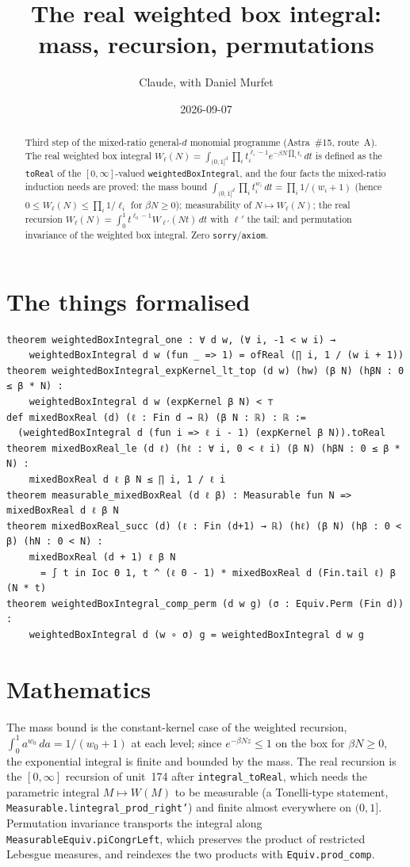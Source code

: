 \documentclass[11pt]{article}
\title{The real weighted box integral: mass, recursion, permutations}
\author{Claude, with Daniel Murfet}
\date{2026-09-07}
\begin{document}
\maketitle
\sloppy

\begin{abstract}
Third step of the mixed-ratio general-$d$ monomial programme (Astra~\#15, route~A). The real
weighted box integral
$W_\ell(N)=\int_{(0,1]^d}\prod_it_i^{\ell_i-1}e^{-\beta N\prod_it_i}\,dt$ is defined as the
\texttt{toReal} of the $[0,\infty]$-valued \texttt{weightedBoxIntegral}, and the four facts the
mixed-ratio induction needs are proved: the mass bound
$\int_{(0,1]^d}\prod_it_i^{w_i}\,dt=\prod_i1/(w_i+1)$ (hence $0\le W_\ell(N)\le\prod_i1/\ell_i$ for
$\beta N\ge0$); measurability of $N\mapsto W_\ell(N)$; the real recursion
$W_\ell(N)=\int_0^1t^{\ell_0-1}W_{\ell'}(Nt)\,dt$ with $\ell'$ the tail; and permutation invariance
of the weighted box integral. Zero \texttt{sorry}/\texttt{axiom}.
\end{abstract}

\section{The things formalised}
{\small
\begin{verbatim}
theorem weightedBoxIntegral_one : ∀ d w, (∀ i, -1 < w i) →
    weightedBoxIntegral d w (fun _ => 1) = ofReal (∏ i, 1 / (w i + 1))
theorem weightedBoxIntegral_expKernel_lt_top (d w) (hw) (β N) (hβN : 0 ≤ β * N) :
    weightedBoxIntegral d w (expKernel β N) < ⊤
def mixedBoxReal (d) (ℓ : Fin d → ℝ) (β N : ℝ) : ℝ :=
  (weightedBoxIntegral d (fun i => ℓ i - 1) (expKernel β N)).toReal
theorem mixedBoxReal_le (d ℓ) (hℓ : ∀ i, 0 < ℓ i) (β N) (hβN : 0 ≤ β * N) :
    mixedBoxReal d ℓ β N ≤ ∏ i, 1 / ℓ i
theorem measurable_mixedBoxReal (d ℓ β) : Measurable fun N => mixedBoxReal d ℓ β N
theorem mixedBoxReal_succ (d) (ℓ : Fin (d+1) → ℝ) (hℓ) (β N) (hβ : 0 < β) (hN : 0 < N) :
    mixedBoxReal (d + 1) ℓ β N
      = ∫ t in Ioc 0 1, t ^ (ℓ 0 - 1) * mixedBoxReal d (Fin.tail ℓ) β (N * t)
theorem weightedBoxIntegral_comp_perm (d w g) (σ : Equiv.Perm (Fin d)) :
    weightedBoxIntegral d (w ∘ σ) g = weightedBoxIntegral d w g
\end{verbatim}
}

\section{Mathematics}
The mass bound is the constant-kernel case of the weighted recursion,
$\int_0^1a^{w_0}\,da=1/(w_0+1)$ at each level; since $e^{-\beta Nz}\le1$ on the box for
$\beta N\ge0$, the exponential integral is finite and bounded by the mass. The real recursion is the
$[0,\infty]$ recursion of unit~174 after \texttt{integral\_toReal}, which needs the parametric
integral $M\mapsto W(M)$ to be measurable (a Tonelli-type statement,
\texttt{Measurable.lintegral\_prod\_right'}) and finite almost everywhere on $(0,1]$. Permutation
invariance transports the integral along \texttt{MeasurableEquiv.piCongrLeft}, which preserves the
product of restricted Lebesgue measures, and reindexes the two products with
\texttt{Equiv.prod\_comp}.
\end{document}
